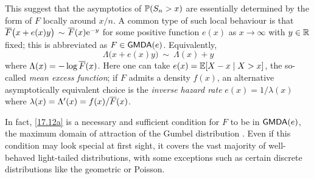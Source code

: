 This suggest that the asymptotics of $\mathbb{P}(S_n>x)$ are essentially determined by the
form of $F$ locally around $x/n$. A common type of such local behaviour is
that $\overline F\bigl(x+e(x)y\bigr)$ $\sim$ $ \overline F(x)\mathrm{e}^{-y}$ for some positive  function $e(x)$
as $x\to\infty$ with $y\in\mathbb{R}$ fixed; this is abbreviated as $F \in \mathsf{GMDA}(e)$. Equivalently,
\begin{equation}\label{17.12a}
\Lambda\bigl(x+e(x)y\bigr)\ \sim\ \Lambda(x) + y
\end{equation}
where $\Lambda(x)=-\log\overline F(x)$.
Here one can take $e(x)=\mathbb{E}[X - x \mid X > x]$, the so-called \emph{mean excess function}; if $F$ admits a density $f(x)$,   an alternative asymptotically equivalent choice is the \emph{inverse hazard rate} $e(x) = 1/\lambda(x)$ where $\lambda(x)=\Lambda'(x)=f(x)/\overline F(x)$.

In fact, \eqref{17.12a} is a necessary and sufficient condition for $F$
to be in $\mathsf{GMDA}(e)$, the maximum domain of attraction of the Gumbel distribution \cite{EKM}. Even if this condition may look
special at first sight, it covers the vast majority of well-behaved light-tailed distributions, with
some exceptions such as certain discrete distributions like the geometric or Poisson.



